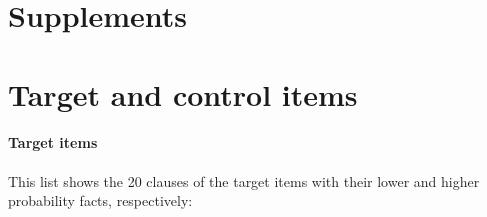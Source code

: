 \documentclass[11pt,fleqn]{article}
\newcommand{\6}{\mbox{$[\hspace*{-.6mm}[$}}
\newcommand{\9}{\mbox{$]\hspace*{-.6mm}]$}}
\begin{document}


%



\newpage

\appendix

\setcounter{table}{0}
\renewcommand{\thetable}{A\arabic{table}}

\setcounter{figure}{0}
\renewcommand{\thefigure}{A\arabic{figure}}

\section*{Supplements}

\section{Target and control items}\label{a-stim}

\paragraph{Target items} This list shows the 20 clauses of the target items with their lower and higher probability facts, respectively:
\end{document}
